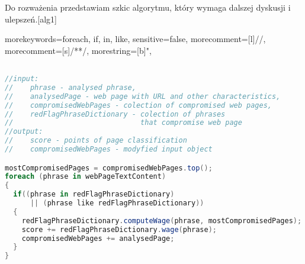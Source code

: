 \documentclass[9pt,a4paper]{extarticle}
\begin{document}
\begin{multicols}{2}
Do rozważenia przedstawiam szkic algorytmu, który wymaga dalszej dyskusji i ulepszeń.[alg1] 
\end{multicols}

%
 {morekeywords={foreach, if, in, like}, sensitive=false, morecomment=[l]{//}, morecomment=[s]{/*}{*/}, morestring=[b]", }
\lstset{
numbers=left, numberstyle=\tiny, stepnumber=1, numbersep=5pt
}
\begin{lstlisting}[title={Alg 1. Podstawowy algorytm klasyfikacji stron internetowych}, language=csharp, label=alg1] 

//input: 
//    phrase - analysed phrase, 
//    analysedPage - web page with URL and other characteristics, 
//    compromisedWebPages - colection of compromised web pages, 
//    redFlagPhraseDictionary - colection of phrases 
//                              that compromise web page
//output:
//    score - points of page classification
//    compromisedWebPages - modyfied input object

mostCompromisedPages = compromisedWebPages.top();
foreach (phrase in webPageTextContent)
{  
  if((phrase in redFlagPhraseDictionary) 
      || (phrase like redFlagPhraseDictionary))
  {
    redFlagPhraseDictionary.computeWage(phrase, mostCompromisedPages);
    score += redFlagPhraseDictionary.wage(phrase);
    compromisedWebPages += analysedPage;
  }
}
\end{lstlisting}
\end{document}
